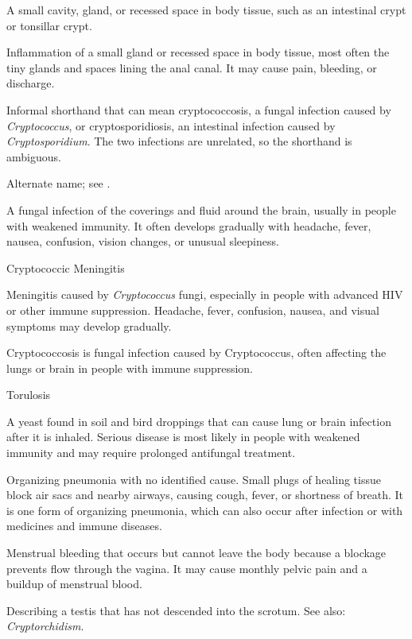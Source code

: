  A small cavity, gland, or recessed space in body tissue, such as an intestinal crypt or tonsillar crypt.

 Inflammation of a small gland or recessed space in body tissue, most often the tiny glands and spaces lining the anal canal. It may cause pain, bleeding, or discharge.

 Informal shorthand that can mean cryptococcosis, a fungal infection caused by \textit{Cryptococcus}, or cryptosporidiosis, an intestinal infection caused by \textit{Cryptosporidium}. The two infections are unrelated, so the shorthand is ambiguous.

 Alternate name; see .

 A fungal infection of the coverings and fluid around the brain, usually in people with weakened immunity. It often develops gradually with headache, fever, nausea, confusion, vision changes, or unusual sleepiness.

\synonyms
Cryptococcic Meningitis

 Meningitis caused by \textit{Cryptococcus} fungi, especially in people with advanced HIV or other immune suppression. Headache, fever, confusion, nausea, and visual symptoms may develop gradually.

 Cryptococcosis is fungal infection caused by Cryptococcus, often affecting the lungs or brain in people with immune suppression.

\synonyms
Torulosis

 A yeast found in soil and bird droppings that can cause lung or brain infection after it is inhaled. Serious disease is most likely in people with weakened immunity and may require prolonged antifungal treatment.

 Organizing pneumonia with no identified
cause. Small plugs of healing tissue block air sacs and nearby airways, causing
cough, fever, or shortness of breath. It is one form of organizing pneumonia, which
can also occur after infection or with medicines and immune diseases.

 Menstrual bleeding that occurs but cannot leave the body because a blockage prevents flow through the vagina. It may cause monthly pelvic pain and a buildup of menstrual blood.

 Describing a testis that has not descended into the scrotum. See also: \textit{Cryptorchidism}.

